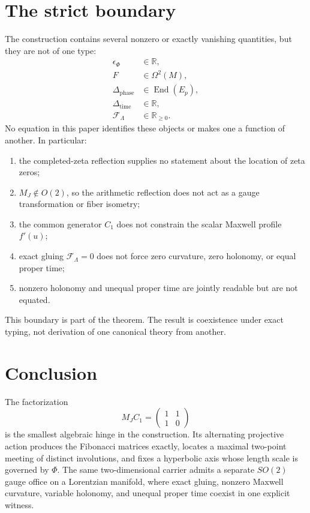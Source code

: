 \documentclass[10pt,oneside]{article}
\theoremstyle{plaincompact}
\theoremstyle{definitioncompact}
\newcommand{\R}{\mathbb R}
\newcommand{\cF}{\mathcal F}
\begin{document}
\section{The strict boundary}

The construction contains several nonzero or exactly vanishing quantities,
but they are not of one type:
\begin{equation}\label{eq:types}
\begin{aligned}
\epsilon_\Phi &\in\R,\\
F &\in\Omega^2(M),\\
\Delta_{\mathrm{phase}} &\in\operatorname{End}(E_p),\\
\Delta_{\mathrm{time}} &\in\R,\\
\cF_\Lambda &\in\R_{\ge0}.
\end{aligned}
\end{equation}
No equation in this paper identifies these objects or makes one a function of
another.  In particular:
\begin{enumerate}[label=(\alph*),leftmargin=2.1em,itemsep=0.3ex,topsep=0.6ex]
\item the completed-zeta reflection supplies no statement about the location
      of zeta zeros;
\item $M_J\notin O(2)$, so the arithmetic reflection does not act as a gauge
      transformation or fiber isometry;
\item the common generator $C_1$ does not constrain the scalar Maxwell profile
      $f'(u)$;
\item exact gluing $\cF_\Lambda=0$ does not force zero curvature, zero holonomy,
      or equal proper time;
\item nonzero holonomy and unequal proper time are jointly readable but are not
      equated.
\end{enumerate}

This boundary is part of the theorem.  The result is coexistence under exact
typing, not derivation of one canonical theory from another.

\section{Conclusion}

The factorization
\begin{equation}\label{eq:closingfactorization}
M_JC_1=
\begin{pmatrix}1&1\\1&0\end{pmatrix}
\end{equation}
is the smallest algebraic hinge in the construction.  Its alternating
projective action produces the Fibonacci matrices exactly, locates a maximal
two-point meeting of distinct involutions, and fixes a hyperbolic axis whose
length scale is governed by $\Phi$.  The same two-dimensional carrier admits a
separate $SO(2)$ gauge office on a Lorentzian manifold, where exact gluing,
nonzero Maxwell curvature, variable holonomy, and unequal proper time coexist
in one explicit witness.
\end{document}
